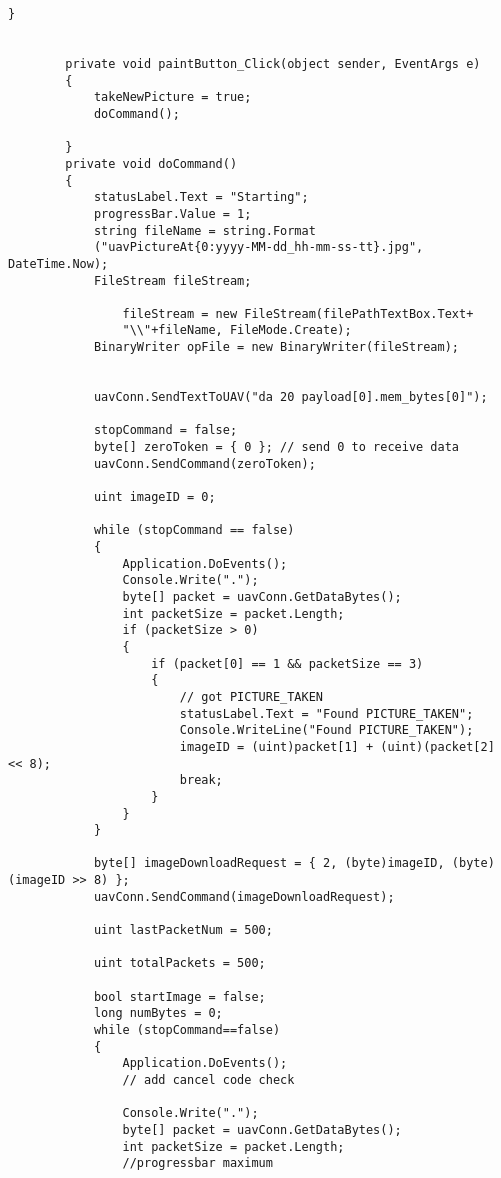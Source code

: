 \begin{lstlisting}[caption=Main Form of GUI, label=appen:main_form]
        }


        private void paintButton_Click(object sender, EventArgs e)
        {
            takeNewPicture = true;
            doCommand();
           
        }
        private void doCommand()
        {
            statusLabel.Text = "Starting";
            progressBar.Value = 1;
            string fileName = string.Format
            ("uavPictureAt{0:yyyy-MM-dd_hh-mm-ss-tt}.jpg", DateTime.Now);
            FileStream fileStream;

                fileStream = new FileStream(filePathTextBox.Text+
                "\\"+fileName, FileMode.Create);
            BinaryWriter opFile = new BinaryWriter(fileStream);


            uavConn.SendTextToUAV("da 20 payload[0].mem_bytes[0]");

            stopCommand = false;
            byte[] zeroToken = { 0 }; // send 0 to receive data
            uavConn.SendCommand(zeroToken);

            uint imageID = 0;

            while (stopCommand == false)
            {
                Application.DoEvents();
                Console.Write(".");
                byte[] packet = uavConn.GetDataBytes();
                int packetSize = packet.Length;
                if (packetSize > 0)
                {
                    if (packet[0] == 1 && packetSize == 3)
                    {
                        // got PICTURE_TAKEN
                        statusLabel.Text = "Found PICTURE_TAKEN";
                        Console.WriteLine("Found PICTURE_TAKEN");
                        imageID = (uint)packet[1] + (uint)(packet[2] << 8);
                        break;
                    }
                }
            }

            byte[] imageDownloadRequest = { 2, (byte)imageID, (byte)(imageID >> 8) };
            uavConn.SendCommand(imageDownloadRequest);

            uint lastPacketNum = 500;

            uint totalPackets = 500;

            bool startImage = false;
            long numBytes = 0;
            while (stopCommand==false)
            {
                Application.DoEvents();
                // add cancel code check

                Console.Write(".");
                byte[] packet = uavConn.GetDataBytes();
                int packetSize = packet.Length;
                //progressbar maximum


\end{lstlisting}
